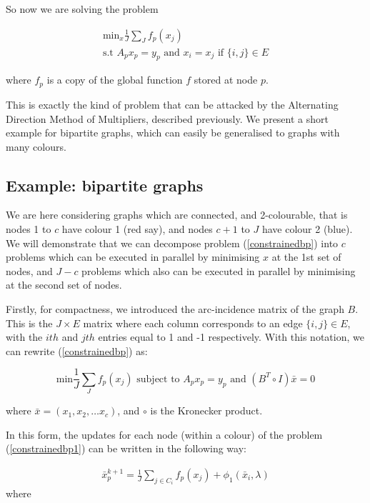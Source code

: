 \documentclass[conference]{IEEEtran}
\begin{document}
So now we are solving the problem


\begin{align}
\text{min}_{x} \frac{1}{J}\sum_J f_p\left(x_j\right)
\\
\text{s.t } A_p x_p = y_p \text{ and } x_i = x_j \text{ if } \{i,j\} \in E 
\label{ constrainedbp}
\end{align}

where \(f_p\) is a copy of the global function \(f\) stored at node \(p\).

This is exactly the kind of problem that can be attacked by the Alternating Direction Method of Multipliers, described previously. We present a short example for bipartite graphs, which can easily be generalised to graphs with many colours. 
 
\subsection{Example: bipartite graphs}
We are here considering graphs which are connected, and 2-colourable, that is nodes 1 to \(c\) have colour 1 (red say), and nodes \(c+1\) to \(J\) have colour 2 (blue). We will demonstrate that we can decompose problem (\ref{constrainedbp}) into \(c\) problems which can be executed in parallel by minimising \(x\) at the 1st set of nodes, and \(J - c\) problems which also can be executed in parallel by minimising at the second set of nodes. 

Firstly, for compactness, we introduced the arc-incidence matrix of the graph \(B\). This is the \(J \times E\) matrix where each column corresponds to an edge \(\{i,j\} \in E\), with the \(ith\) and \(jth\) entries equal to 1 and -1 respectively. With this notation, we can rewrite (\ref{constrainedbp}) as:

\begin{equation}
\text{min} \frac{1}{J}\sum_J f_p\left(x_j\right) \text{ subject to } A_p x_p = y_p \text{ and } \left(B^T \circ I \right)\bar{x} = 0 
 \label{constrainedbp1}
\end{equation}

where \(\bar{x} = \left(x_1, x_2, \ldots x_c \right)\), and \(\circ\) is the Kronecker product. 

In this form, the updates for each node (within a colour) of the problem (\ref{constrainedbp1}) can be written in the following way:

\begin{align*}
\bar{x}_p^{k+1} = \frac{1}{J}\sum_{j \in C_i} f_p\left(x_j\right) + \phi_1\left(\bar{x}_i, \lambda\right)
\end{align*}
where 
\end{document}
